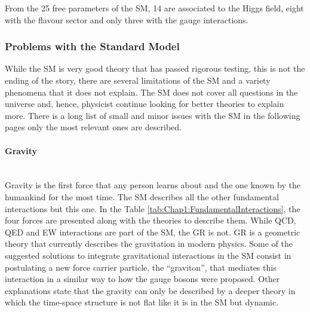 From the 25 free parameters of the SM, 14 are associated to the Higgs field, eight with the flavour sector and
only three with the gauge interactions.


\subsubsection{Problems with the Standard Model}
\label{sec:chap1:SM_problems}
While the SM is very good theory that has passed rigorous testing, this is not the ending of the story, 
there are several limitations of the SM and a variety phenomena that it does not explain. The SM 
does not cover all questions in the universe and, hence, physicist continue looking for better theories 
to explain more.  There is a long list of  small and minor issues with the SM in the following pages only 
the most relevant ones are described.

\paragraph{Gravity}\mbox{}\\
Gravity is the first force that any person learns about and the one known by the humankind for the most time. 
The SM describes all the other fundamental interactions but this one. In the Table \ref{tab:Chap1:FundamentalInteractions},
the four forces are presented along with the theories to describe them. While QCD, QED and EW interactions are part of the
SM, the GR is not. GR is a geometric theory that currently describes the gravitation in modern physics.
Some of the suggested solutions to integrate gravitational interactions in the SM consist in
postulating a new force carrier particle, the ``graviton'', that mediates this interaction in a similar way to how the gauge bosons
were proposed. Other explanations state that the gravity can only be described by a deeper theory in which the 
time-space structure is not flat like it is in the SM but dynamic. 

